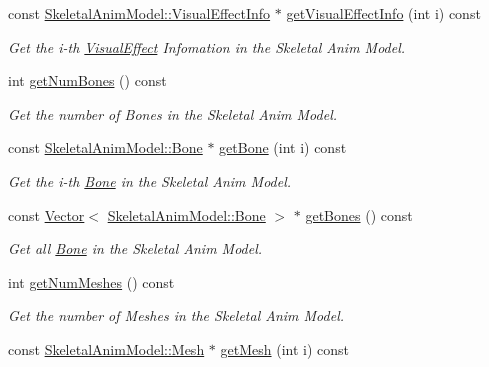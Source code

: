 \begin{DoxyCompactItemize}
const \hyperlink{class_magnum_1_1_skeletal_anim_model_1_1_visual_effect_info}{Skeletal\+Anim\+Model\+::\+Visual\+Effect\+Info} $\ast$ \hyperlink{class_magnum_1_1_skeletal_anim_model_1_1_resource_a3dd8b02078de533dd173cb101c261e14}{get\+Visual\+Effect\+Info} (int i) const 
\begin{DoxyCompactList}\small\item\em Get the i-\/th \hyperlink{class_magnum_1_1_visual_effect}{Visual\+Effect} Infomation in the Skeletal Anim Model. \end{DoxyCompactList}\item 
int \hyperlink{class_magnum_1_1_skeletal_anim_model_1_1_resource_ae7acb007f9187670186b520196932365}{get\+Num\+Bones} () const 
\begin{DoxyCompactList}\small\item\em Get the number of Bones in the Skeletal Anim Model. \end{DoxyCompactList}\item 
const \hyperlink{class_magnum_1_1_skeletal_anim_model_1_1_bone}{Skeletal\+Anim\+Model\+::\+Bone} $\ast$ \hyperlink{class_magnum_1_1_skeletal_anim_model_1_1_resource_a9038a490b3b4337ecae392b257aa9ca3}{get\+Bone} (int i) const 
\begin{DoxyCompactList}\small\item\em Get the i-\/th \hyperlink{class_magnum_1_1_skeletal_anim_model_1_1_bone}{Bone} in the Skeletal Anim Model. \end{DoxyCompactList}\item 
const \hyperlink{class_magnum_1_1_vector}{Vector}$<$ \hyperlink{class_magnum_1_1_skeletal_anim_model_1_1_bone}{Skeletal\+Anim\+Model\+::\+Bone} $>$ $\ast$ \hyperlink{class_magnum_1_1_skeletal_anim_model_1_1_resource_ad65b9de0b41413ffed32fabb56aa7dfe}{get\+Bones} () const 
\begin{DoxyCompactList}\small\item\em Get all \hyperlink{class_magnum_1_1_skeletal_anim_model_1_1_bone}{Bone} in the Skeletal Anim Model. \end{DoxyCompactList}\item 
int \hyperlink{class_magnum_1_1_skeletal_anim_model_1_1_resource_a7af8af6cdd06181ca6b6810934a68885}{get\+Num\+Meshes} () const 
\begin{DoxyCompactList}\small\item\em Get the number of Meshes in the Skeletal Anim Model. \end{DoxyCompactList}\item 
const \hyperlink{class_magnum_1_1_skeletal_anim_model_1_1_mesh}{Skeletal\+Anim\+Model\+::\+Mesh} $\ast$ \hyperlink{class_magnum_1_1_skeletal_anim_model_1_1_resource_a45ce1b3c8784841cf6721d1ad37b417c}{get\+Mesh} (int i) const 

\end{DoxyCompactItemize}
